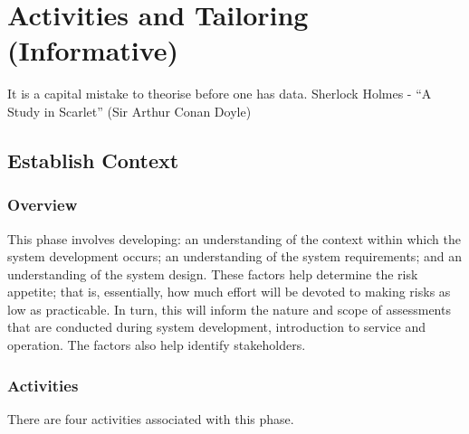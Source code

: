 %
%
\section{Activities and Tailoring (Informative)} \label{bkm:activitiestailoring}

\dsiwgSectionQuote
  {It is a capital mistake to theorise before one has data.}
  {Sherlock Holmes - ``A Study in Scarlet'' (Sir Arthur Conan Doyle)}


\subsection{Establish Context}
\subsubsection{Overview}
This phase involves developing: an understanding of the context within which the system development occurs; an understanding of the system requirements; and an understanding of the system design.
These factors help determine the risk appetite; that is, essentially, how much effort will be devoted to making risks as low as practicable. In turn, this will inform the nature and scope of assessments that are conducted during system development, introduction to service and operation. The factors also help identify \glspl{stakeholder}.

\subsubsection{Activities}
There are four activities associated with this phase.

